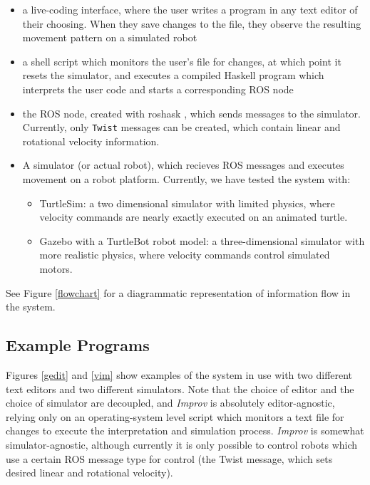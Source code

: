 \documentclass[sigconf]{acmart}
\begin{document}
\begin{itemize}
\item
  a live-coding interface, where the user writes a program in any text
  editor of their choosing. When they save changes to the file, they
  observe the resulting movement pattern on a simulated robot
\item
  a shell script which monitors the user's file for changes, at which
  point it resets the simulator, and executes a compiled Haskell program
  which interprets the user code and starts a corresponding ROS node
\item
  the ROS node, created with roshask \cite{cowley2011stream}, which sends messages to
  the simulator. Currently, only \texttt{Twist} messages can be created,
  which contain linear and rotational velocity information.
\item
  A simulator (or actual robot), which recieves ROS messages and
  executes movement on a robot platform. Currently, we have tested the
  system with:
  \begin{itemize}
  \item
    TurtleSim: a two dimensional simulator with limited physics, where
    velocity commands are nearly exactly executed on an animated turtle.
  \item
    Gazebo with a TurtleBot robot model: a three-dimensional simulator
    with more realistic physics, where velocity commands control
    simulated motors.
  \end{itemize}
\end{itemize}

See Figure \ref{flowchart} for a diagrammatic representation of
information flow in the system.


\subsection{Example Programs}\label{example-programs}

Figures \ref{gedit} and \ref{vim} show examples of the system in use with two
different text editors and two different simulators. Note that the choice of
editor and the choice of simulator are decoupled, and \emph{Improv} is
absolutely editor-agnostic, relying only on an operating-system level script
which monitors a text file for changes to execute the interpretation and
simulation process. \emph{Improv} is somewhat simulator-agnostic, although
currently it is only possible to control robots which use a certain ROS message
type for control (the Twist message, which sets desired linear and rotational
velocity).
\end{document}

